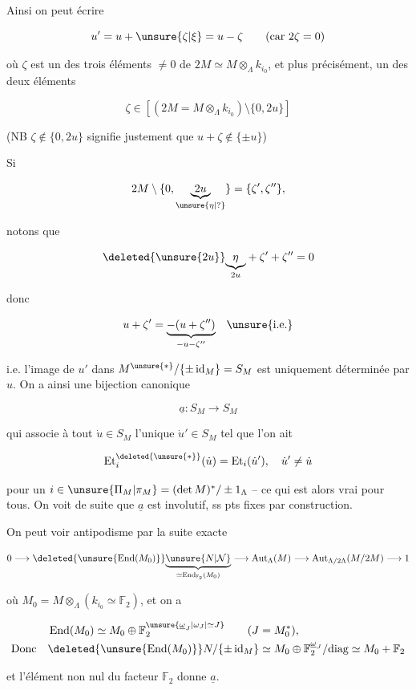 

Ainsi on peut écrire

\[
u'=u+\unsure{\zeta|\xi}=u-\zeta\qquad(\text{car }2\zeta=0)
\]

où $\zeta$ est un des trois éléments $\ne0$ de $2M\simeq M\otimes_\Lambda k_{i_0}$, et plus précisément, un des deux éléments \deleted{\unsure{$\ne$}}

\[
\zeta\in[(2M=M\otimes_\Lambda k_{i_0})\setminus\{0,2u\}]
\]

(NB $\zeta\notin\{0,2u\}$ signifie justement que $u+\zeta\notin\{\pm u\}$)

Si

\[
2M\setminus\{0,\underset{\unsure{\eta|?}}{\underbrace{2u}}\}=\{\zeta',\zeta''\},
\]

notons que 

\[
\deleted{\unsure{2u}}\underset{2u}{\underbrace{\eta}}+\zeta'+\zeta''=0
\]

donc

\[
u+\zeta'=\underset{-u-\zeta''}{\underbrace{-(u+\zeta'')}}\quad\unsure{\text{i.e.}}
\]

i.e. l'image de $u'$ dans $M^{\unsure{*}}/\{\pm\operatorname{id}_M\}=S_M$ est uniquement déterminée par $u$.  On  a ainsi une bijection canonique

\[
\underline a:S_M\longrightarrow S_M
\]

qui associe à tout $\dot u\in S_M$ l'unique $\dot u'\in S_M$ tel que l'on ait

\[
\operatorname{Et}^{\deleted{\unsure{*}}}_{i}(\dot u)=\operatorname{Et}_i(\dot u'),\quad \dot u'\ne\dot u
\]

pour un $i\in\unsure{\Pi_M|\pi_M}=(\det M)^*/\pm1_\Lambda$ -- ce qui est alors vrai pour tous. On voit de suite que $\underline a$ est involutif,  ss pts fixes par construction.

On peut voir  antipodisme par la suite exacte

\[
0\longrightarrow\deleted{\unsure{\operatorname{End}(M_0)}}\underset{\simeq\operatorname{End}_{\mathbb F_2}(M_0)}{\underbrace{\unsure{N|\mathcal N}}}\longrightarrow\operatorname{Aut}_\Lambda(M)\longrightarrow\operatorname{Aut}_{\Lambda/2\Lambda}(M/2M)\longrightarrow1
\]

où $M_0=M\otimes_\Lambda(k_{i_0}\simeq\mathbb F_2)$, et on a

\[
\begin{aligned}
&\operatorname{End}(M_0)\simeq M_0\oplus\mathbb F_2^{\unsure{\underline\omega_J|\omega_J|\simeq J}}\qquad(J=M_0^*),\\
\text{Donc}\quad&\deleted{\unsure{\operatorname{End}(M_0)}}N/\{\pm\operatorname{id}_M\}\simeq M_0\oplus\mathbb F_2^{\underline\omega_J}/\text{diag}\simeq M_0+\mathbb F_2
\end{aligned}
\]

et l'élément non nul du facteur $\mathbb F_2$ donne $\underline a$.
